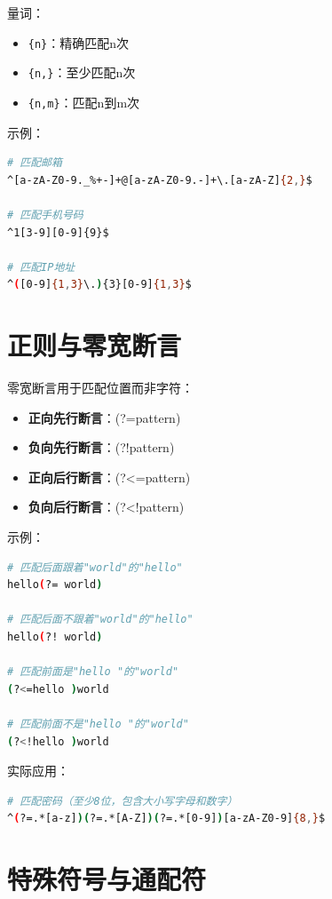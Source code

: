 \documentclass[12pt,UTF8]{ctexbook}
\begin{document}
量词：
\begin{itemize}
    \item \texttt{\{n\}}：精确匹配n次
    \item \texttt{\{n,\}}：至少匹配n次
    \item \texttt{\{n,m\}}：匹配n到m次
\end{itemize}

示例：
\begin{lstlisting}[language=bash]
# 匹配邮箱
^[a-zA-Z0-9._%+-]+@[a-zA-Z0-9.-]+\.[a-zA-Z]{2,}$

# 匹配手机号码
^1[3-9][0-9]{9}$

# 匹配IP地址
^([0-9]{1,3}\.){3}[0-9]{1,3}$
\end{lstlisting}

\section{正则与零宽断言}
\label{sec:regex-assertions}

零宽断言用于匹配位置而非字符：

\begin{itemize}
    \item \textbf{正向先行断言}：(?=pattern)
    \item \textbf{负向先行断言}：(?!pattern)
    \item \textbf{正向后行断言}：(?<=pattern)
    \item \textbf{负向后行断言}：(?<!pattern)
\end{itemize}

示例：
\begin{lstlisting}[language=bash]
# 匹配后面跟着"world"的"hello"
hello(?= world)

# 匹配后面不跟着"world"的"hello"
hello(?! world)

# 匹配前面是"hello "的"world"
(?<=hello )world

# 匹配前面不是"hello "的"world"
(?<!hello )world
\end{lstlisting}

实际应用：
\begin{lstlisting}[language=bash]
# 匹配密码（至少8位，包含大小写字母和数字）
^(?=.*[a-z])(?=.*[A-Z])(?=.*[0-9])[a-zA-Z0-9]{8,}$
\end{lstlisting}

\section{特殊符号与通配符}
\label{sec:special-symbols}
\end{document}
